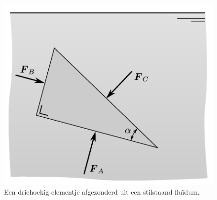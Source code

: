 \begin{figure}[htb]
	\centering
	\includegraphics{fig/hydrostatica/driehoek_uit_stilstaande_vloeistof}
	\caption{Een driehoekig elementje afgezonderd uit een stilstaand fluïdum.}
	\label{fig:driehoek_uit_stilstaande_vloeistof}
\end{figure}

